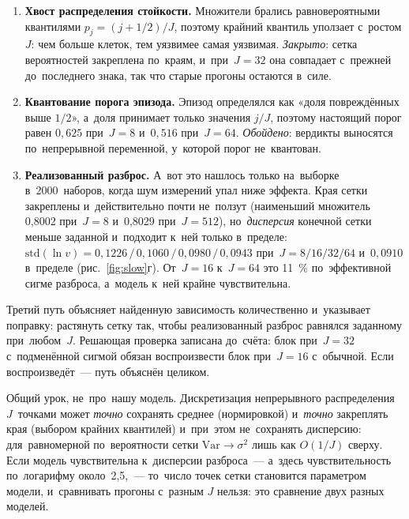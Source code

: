 \documentclass[11pt,a4paper,landscape,twocolumn]{article}
\begin{document}
\begin{enumerate}
\item \textbf{Хвост распределения стойкости.} Множители брались равновероятными квантилями $p_j=(j+1/2)/J$, поэтому крайний квантиль уползает с~ростом $J$: чем больше клеток, тем уязвимее самая уязвимая. \emph{Закрыто}: сетка вероятностей закреплена по~краям, и~при~$J=32$ она совпадает с~прежней до~последнего знака, так что старые прогоны остаются в~силе.
\item \textbf{Квантование порога эпизода.} Эпизод определялся как «доля повреждённых выше $1/2$», а~доля принимает только значения $j/J$, поэтому настоящий порог равен $0{,}625$ при~$J=8$ и~$0{,}516$ при~$J=64$. \emph{Обойдено}: вердикты выносятся по~непрерывной переменной, у~которой порог не~квантован.
\item \textbf{Реализованный разброс.} А~вот это нашлось только на~выборке в~2000~наборов, когда шум измерений упал ниже эффекта. Края сетки закреплены и~действительно почти не~ползут (наименьший множитель 0,8002 при~$J=8$ и~0,8029 при~$J=512$), но~\emph{дисперсия} конечной сетки меньше заданной и~подходит к~ней только в~пределе: $\mathrm{std}(\ln v)=0{,}1226\,/\,0{,}1060\,/\,0{,}0980\,/\,0{,}0943$ при~$J=8/16/32/64$ и~$0{,}0910$ в~пределе (рис.~\ref{fig:slow}г). От~$J=16$ к~$J=64$ это 11~\% по~эффективной сигме разброса, а~модель к~ней крайне чувствительна.
\end{enumerate}

Третий путь объясняет найденную зависимость количественно и~указывает поправку: растянуть сетку так, чтобы реализованный разброс равнялся заданному при~любом~$J$. Решающая проверка записана до~счёта: блок при~$J=32$ с~подменённой сигмой обязан воспроизвести блок при~$J=16$ с~обычной. Если воспроизведёт~— путь объяснён целиком.

\begin{ineq}
Общий урок, не~про~нашу модель. Дискретизация непрерывного распределения $J$~точками может \emph{точно} сохранять среднее (нормировкой) и~\emph{точно} закреплять края (выбором крайних квантилей) и~при~этом не~сохранять дисперсию: для~равномерной по~вероятности сетки $\mathrm{Var}\to\sigma^2$ лишь как $O(1/J)$ сверху. Если модель чувствительна к~дисперсии разброса~— а~здесь чувствительность по~логарифму около~2,5,~— то~число точек сетки становится параметром модели, и~сравнивать прогоны с~разным $J$ нельзя: это сравнение двух разных моделей.
\end{ineq}

\end{document}
